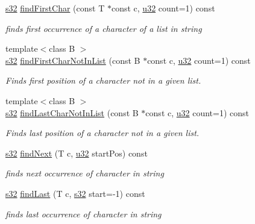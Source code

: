 \begin{DoxyCompactItemize}
\hyperlink{namespaceirr_ac66849b7a6ed16e30ebede579f9b47c6}{s32} \hyperlink{classirr_1_1core_1_1string_a0185b250f029b1e90f8620e689d2c57a}{find\+First\+Char} (const T $\ast$const c, \hyperlink{namespaceirr_a0416a53257075833e7002efd0a18e804}{u32} count=1) const 
\begin{DoxyCompactList}\small\item\em finds first occurrence of a character of a list in string \end{DoxyCompactList}\item 
{\footnotesize template$<$class B $>$ }\\\hyperlink{namespaceirr_ac66849b7a6ed16e30ebede579f9b47c6}{s32} \hyperlink{classirr_1_1core_1_1string_af8658311bfe1feaf21c81068b0fc0fd7}{find\+First\+Char\+Not\+In\+List} (const B $\ast$const c, \hyperlink{namespaceirr_a0416a53257075833e7002efd0a18e804}{u32} count=1) const 
\begin{DoxyCompactList}\small\item\em Finds first position of a character not in a given list. \end{DoxyCompactList}\item 
{\footnotesize template$<$class B $>$ }\\\hyperlink{namespaceirr_ac66849b7a6ed16e30ebede579f9b47c6}{s32} \hyperlink{classirr_1_1core_1_1string_ad9ef9ae6702403fe196ccfcb7fcd14d8}{find\+Last\+Char\+Not\+In\+List} (const B $\ast$const c, \hyperlink{namespaceirr_a0416a53257075833e7002efd0a18e804}{u32} count=1) const 
\begin{DoxyCompactList}\small\item\em Finds last position of a character not in a given list. \end{DoxyCompactList}\item 
\hyperlink{namespaceirr_ac66849b7a6ed16e30ebede579f9b47c6}{s32} \hyperlink{classirr_1_1core_1_1string_a6d82f74b061b248f01133f34b94841d9}{find\+Next} (T c, \hyperlink{namespaceirr_a0416a53257075833e7002efd0a18e804}{u32} start\+Pos) const 
\begin{DoxyCompactList}\small\item\em finds next occurrence of character in string \end{DoxyCompactList}\item 
\hyperlink{namespaceirr_ac66849b7a6ed16e30ebede579f9b47c6}{s32} \hyperlink{classirr_1_1core_1_1string_a000258d8ce7a49ba10d20bfb8d9d3ad8}{find\+Last} (T c, \hyperlink{namespaceirr_ac66849b7a6ed16e30ebede579f9b47c6}{s32} start=-\/1) const 
\begin{DoxyCompactList}\small\item\em finds last occurrence of character in string \end{DoxyCompactList}\item 

\end{DoxyCompactItemize}
